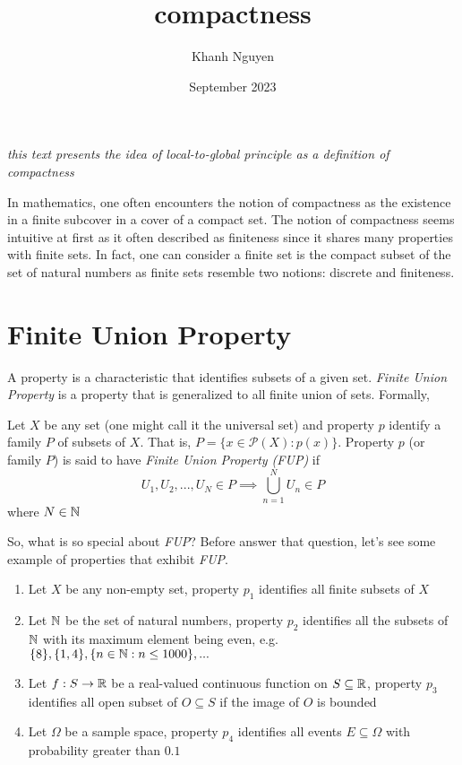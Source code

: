 \documentclass{article}
\title{
    compactness
}
\author{Khanh Nguyen}
\date{September 2023}
\begin{document}
\maketitle

\emph{this text presents the idea of local-to-global principle as a definition of compactness}

In mathematics, one often encounters the notion of compactness as the existence in a finite subcover in a cover of a compact set. The notion of compactness seems intuitive at first as it often described as finiteness since it shares many properties with finite sets. In fact, one can consider a finite set is the compact subset of the set of natural numbers as finite sets resemble two notions: discrete and finiteness.

\section{Finite Union Property}

A property is a characteristic that identifies subsets of a given set. \emph{Finite Union Property} is a property that is generalized to all finite union of sets. Formally,

\begin{definition}
	Let $X$ be any set (one might call it the universal set) and property $p$ identify a family $P$ of subsets of $X$. That is, $P = \{ x \in \mathcal{P}(X): p(x) \}$.
   Property $p$ (or family $P$) is said to have \emph{Finite Union Property (FUP)} if
    $$
    	U_1, U_2, ..., U_N \in P \implies \bigcup_{n=1}^N U_n \in P
    $$
    where $N \in \mathbb{N}$
\end{definition}



So, what is so special about \emph{FUP}? Before answer that question, let's see some example of properties that exhibit \emph{FUP}.

\begin{enumerate}
	\item Let $X$ be any non-empty set, property $p_1$ identifies all  finite subsets of $X$ \label{example1}
    \item Let $\mathbb{N}$ be the set of natural numbers, property $p_2$ identifies all the subsets of $\mathbb{N}$ with its maximum element being even, e.g. $\{8\}, \{1, 4\}, \{n \in \mathbb{N}: n \leq 1000 \}, ...$  \label{example2}
    \item Let $f: S \to \mathbb{R}$ be a real-valued continuous function on $S \subseteq \mathbb{R}$, property $p_3$ identifies all open subset of $O \subseteq S$ if the image of $O$ is bounded  \label{example3}
    \item Let $\Omega$ be a sample space, property $p_4$ identifies all events $E \subseteq \Omega$ with probability greater than $0.1$  \label{example4}
\end{enumerate}
\end{document}
